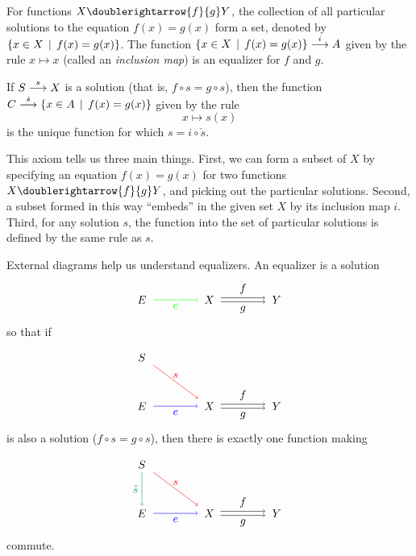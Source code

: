\begin{principle}
	For functions $X\doublerightarrow{f}{g} Y$, the collection of all particular solutions to the equation $f(x)=g(x)$ form a set, denoted by $\{x\in X\st f(x) = g(x)\}$. 	
	The function $\sfromto i{\{x\in X\st f(x)=g(x)\}}A$ given by the rule $x\mapsto x$ (called an \emph{inclusion map}) is an equalizer for $f$ and $g$.
	
	If $\sfromto sSX$ is a solution (that is, $f\circ s = g\circ s$),
	then the function $\sfromto {\check s}C{\{x\in A\st f(x)=g(x)\}}$ given by the rule 
	\[x\mapsto s(x)\]
	is the unique function for which $s = i\circ \check s$.
\end{principle}

This axiom tells us three main things.
First, we can form a subset of $X$ by specifying an equation $f(x)=g(x)$ for two functions $X\doublerightarrow{f}{g}Y$, and picking out the particular solutions.
Second, a subset formed in this way ``embeds'' in the given set $X$ by its inclusion map $i$.
Third, for any solution $s$, the function into the set of particular solutions is defined by the same rule as $s$.

External diagrams help us understand equalizers. 
An equalizer is a solution
\[
\begin{tikzpicture}
\matrix (m) [row sep=3em,column sep=4em,minimum width=2em]
{
	\node (E) {$E$}; & \node (A) {$X$}; & \node (B) {$Y$};\\
};
\draw[->, green] (E.east) -- node[anchor=north] {$e$} (A.west); 
\draw[->] (A.10) -- node[anchor=south]  {$f$} (B.170) ;
\draw[->] (A.350) -- node[anchor=north]  {$g$} (B.190);
\end{tikzpicture}
\]
so that if 
\[
\begin{tikzpicture}
\matrix (m) [row sep=3em,column sep=4em,minimum width=2em]
{
	\node (S) {$S$};\\
	\node (E) {$E$}; & \node (A) {$X$}; & \node (B) {$Y$};\\
};
\draw[->, red] (S.south east) -- node[anchor=south] {$s$} (A.north west);
\draw[->, blue] (E.east) -- node[anchor=north] {$e$} (A.west); 
\draw[->] (A.10) -- node[anchor=south]  {$f$} (B.170) ;
\draw[->] (A.350) -- node[anchor=north]  {$g$} (B.190);
\end{tikzpicture}
\]
is also a solution ($f\circ s=g\circ s$), then there is exactly one function making
\[
\begin{tikzpicture}
\matrix (m) [row sep=3em,column sep=4em,minimum width=2em]
{
	\node (S) {$S$};\\
	\node (E) {$E$}; & \node (A) {$X$}; & \node (B) {$Y$};\\
};
\draw[->,ForestGreen] (S.south) -- node[anchor=east] {$\check s$} (E.north);
\draw[->, red] (S.south east) -- node[anchor=south] {$s$} (A.north west);
\draw[->, blue] (E.east) -- node[anchor=north] {$e$} (A.west); 
\draw[->] (A.10) -- node[anchor=south]  {$f$} (B.170) ;
\draw[->] (A.350) -- node[anchor=north]  {$g$} (B.190);
\end{tikzpicture}
\]
commute.

